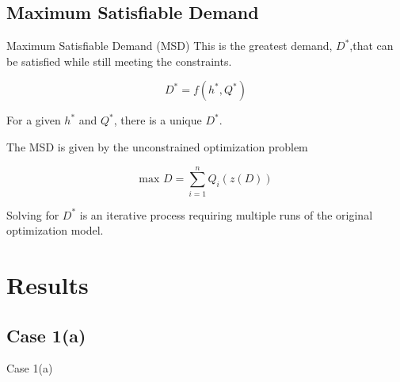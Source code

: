 \documentclass[xcolor=x11names,compress]{beamer}
\renewcommand{\(}{\begin{columns}}
\renewcommand{\)}{\end{columns}}
\newcommand{\<}[1]{\begin{column}{#1}}
\renewcommand{\>}{\end{column}}
\begin{document}
\subsection{Maximum Satisfiable Demand}
\begin{frame}{Maximum Satisfiable Demand (MSD)}
This is the greatest demand, $D^*$,that can be satisfied while still meeting the constraints.

$$D^*= f(h^*,Q^*)$$

For a given $h^*$ and $Q^*$, there is a unique $D^*$.

\pause The MSD is given by the unconstrained optimization problem

$$\mbox{max}\,\,D=\sum_{i=1}^nQ_i(z(D))$$

Solving for $D^*$ is an iterative process requiring multiple runs of the original optimization model.
\end{frame}

\section{Results}
\subsection{Case 1(a)}
\begin{frame}{Case 1(a)}

\begin{figure}[!ht]
\centering
{}
\end{figure}

\end{frame}
\end{document}
